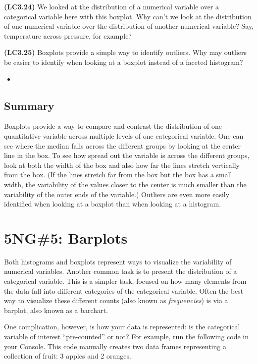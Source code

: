 \documentclass[12pt,]{krantz}
\newenvironment{rmdblock}[1]
  {\begin{shaded*}
  \begin{itemize}
  \renewcommand{\labelitemi}{
    \raisebox{-.7\height}[0pt][0pt]{
    }
  }
  \item
  }
  {
  \end{itemize}
  \end{shaded*}
  }
\newenvironment{learncheck}
  {\begin{rmdblock}{warning}}
  {\end{rmdblock}}
\theoremstyle{definition}
\theoremstyle{definition}
\theoremstyle{definition}
\theoremstyle{remark}
\begin{document}
\textbf{(LC3.24)} We looked at the distribution of a numerical variable
over a categorical variable here with this boxplot. Why can't we look at
the distribution of one numerical variable over the distribution of
another numerical variable? Say, temperature across pressure, for
example?

\textbf{(LC3.25)} Boxplots provide a simple way to identify outliers.
Why may outliers be easier to identify when looking at a boxplot instead
of a faceted histogram?

\begin{learncheck}

\end{learncheck}

\subsection{Summary}\label{summary-3}

Boxplots provide a way to compare and contrast the distribution of one
quantitative variable across multiple levels of one categorical
variable. One can see where the median falls across the different groups
by looking at the center line in the box. To see how spread out the
variable is across the different groups, look at both the width of the
box and also how far the lines stretch vertically from the box. (If the
lines stretch far from the box but the box has a small width, the
variability of the values closer to the center is much smaller than the
variability of the outer ends of the variable.) Outliers are even more
easily identified when looking at a boxplot than when looking at a
histogram.

\section{5NG\#5: Barplots}\label{geombar}

Both histograms and boxplots represent ways to visualize the variability
of numerical variables. Another common task is to present the
distribution of a categorical variable. This is a simpler task, focused
on how many elements from the data fall into different categories of the
categorical variable. Often the best way to visualize these different
counts (also known as \emph{frequencies}) is via a barplot, also known
as a barchart.

One complication, however, is how your data is represented: is the
categorical variable of interest ``pre-counted'' or not? For example,
run the following code in your Console. This code manually creates two
data frames representing a collection of fruit: 3 apples and 2 oranges.
\end{document}
